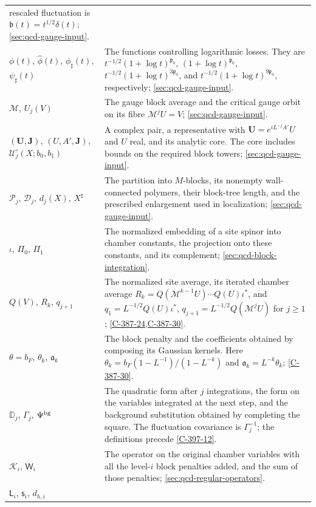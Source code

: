 \documentclass[11pt,letterpaper,reqno]{amsart}
\theoremstyle{definition}
\theoremstyle{remark}
\begin{document}
\begin{longtable}{@{}p{}@{\hspace{0.025\textwidth}}p{}@{}}
rescaled fluctuation is $\mathfrak b(t)=t^{1/2}\delta(t)$;
\cref{sec:qcd-gauge-input}.\\
$\phi(t)$, $\widehat\phi(t)$, $\phi_\sharp(t)$, $\psi_\sharp(t)$
& The functions controlling logarithmic losses. They are
$t^{-1/2}(1+\log t)^{\mathfrak p_0}$,
$(1+\log t)^{\mathfrak p_0}$,
$t^{-1/2}(1+\log t)^{3\mathfrak p_0}$, and
$t^{-1/2}(1+\log t)^{9\mathfrak p_0}$, respectively;
\cref{sec:qcd-gauge-input}.\\
$\mathcal M$, $U_j(V)$
& The gauge block average and the critical gauge orbit on its
fibre $\mathcal M^jU=V$; \cref{sec:qcd-gauge-input}.\\
$(\mathbf U,\mathbf J)$, $(U,A',\mathbf J)$,
$\mathcal U_j^\circ(X;b_0,b_1)$
& A complex pair, a representative with
$\mathbf U=e^{iL^{-j}A'}U$ and $U$ real, and its analytic core.
The core includes bounds on the required block towers;
\cref{sec:qcd-gauge-input}.\\
$\mathcal P_j$, $\mathcal D_j$, $d_j(X)$, $X^\sharp$
& The partition into $M$-blocks, its nonempty wall-connected
polymers, their block-tree length, and the prescribed enlargement
used in localization; \cref{sec:qcd-gauge-input}.\\
$\iota$, $\Pi_0$, $\Pi_1$
& The normalized embedding of a site spinor into chamber constants,
the projection onto these constants, and its complement;
\cref{sec:qcd-block-integration}.\\
$Q(V)$, $R_k$, $q_{j+1}$
& The normalized site average, its iterated chamber average
$R_k=Q(\mathcal M^{k-1}U)\cdots Q(U)\iota^*$, and
$q_1=L^{-1/2}Q(U)\iota^*$,
$q_{j+1}=L^{-1/2}Q(\mathcal M^jU)$ for $j\ge1$;
\cref{C-387-24,C-387-30}.\\
$\theta=b_F$, $\theta_k$, $\mathfrak a_k$
& The block penalty and the coefficients obtained by composing
its Gaussian kernels. Here
$\theta_k=b_F(1-L^{-1})/(1-L^{-k})$ and
$\mathfrak a_k=L^{-k}\theta_k$; \cref{C-387-30}.\\
$\mathbb D_j$, $\Gamma_j$, $\Psi^{\rm bg}$
& The quadratic form after $j$ integrations, the form on the
variables integrated at the next step, and the background
substitution obtained by completing the square.
The fluctuation covariance is $\Gamma_j^{-1}$;
the definitions precede \cref{C-397-12}.\\
$\mathcal K_i$, $\mathsf W_i$
& The operator on the original chamber variables with all the
level-$i$ block penalties added, and the sum of those penalties;
\cref{sec:qcd-regular-operators}.\\
$\mathsf L_i$, $\mathsf s_i$, $d_{h,i}$

\end{longtable}
\end{document}
